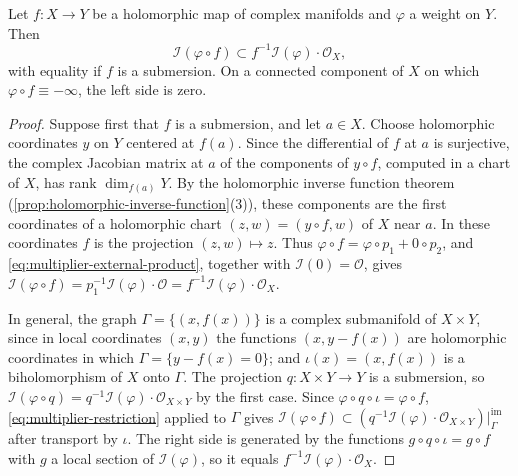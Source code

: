 \begin{corollary}\label{cor:multiplier-holomorphic-pullback}
Let $f\colon X\to Y$ be a holomorphic map of complex manifolds and $\varphi$ a weight on $Y$. Then
\[
 \mathcal I(\varphi\circ f)\subset f^{-1}\mathcal I(\varphi)\cdot\mathcal O_X,
\]
with equality if $f$ is a submersion. On a connected component of $X$ on which $\varphi\circ f\equiv-\infty$, the left side is zero.
\end{corollary}
\begin{proof}
Suppose first that $f$ is a submersion, and let $a\in X$. Choose holomorphic coordinates $y$ on $Y$ centered at $f(a)$. Since the differential of $f$ at $a$ is surjective, the complex Jacobian matrix at $a$ of the components of $y\circ f$, computed in a chart of $X$, has rank $\dim_{f(a)}Y$. By the holomorphic inverse function theorem (\cref{prop:holomorphic-inverse-function}(3)), these components are the first coordinates of a holomorphic chart $(z,w)=(y\circ f,w)$ of $X$ near $a$. In these coordinates $f$ is the projection $(z,w)\mapsto z$. Thus $\varphi\circ f=\varphi\circ p_1+0\circ p_2$, and \eqref{eq:multiplier-external-product}, together with $\mathcal I(0)=\mathcal O$, gives $\mathcal I(\varphi\circ f)=p_1^{-1}\mathcal I(\varphi)\cdot\mathcal O=f^{-1}\mathcal I(\varphi)\cdot\mathcal O_X$.

In general, the graph $\Gamma=\{(x,f(x))\}$ is a complex submanifold of $X\times Y$, since in local coordinates $(x,y)$ the functions $(x,y-f(x))$ are holomorphic coordinates in which $\Gamma=\{y-f(x)=0\}$; and $\iota(x)=(x,f(x))$ is a biholomorphism of $X$ onto $\Gamma$. The projection $q\colon X\times Y\to Y$ is a submersion, so $\mathcal I(\varphi\circ q)=q^{-1}\mathcal I(\varphi)\cdot\mathcal O_{X\times Y}$ by the first case. Since $\varphi\circ q\circ\iota=\varphi\circ f$, \eqref{eq:multiplier-restriction} applied to $\Gamma$ gives $\mathcal I(\varphi\circ f)\subset(q^{-1}\mathcal I(\varphi)\cdot\mathcal O_{X\times Y})|_\Gamma^{\mathrm{im}}$ after transport by $\iota$. The right side is generated by the functions $g\circ q\circ\iota=g\circ f$ with $g$ a local section of $\mathcal I(\varphi)$, so it equals $f^{-1}\mathcal I(\varphi)\cdot\mathcal O_X$.
\end{proof}

